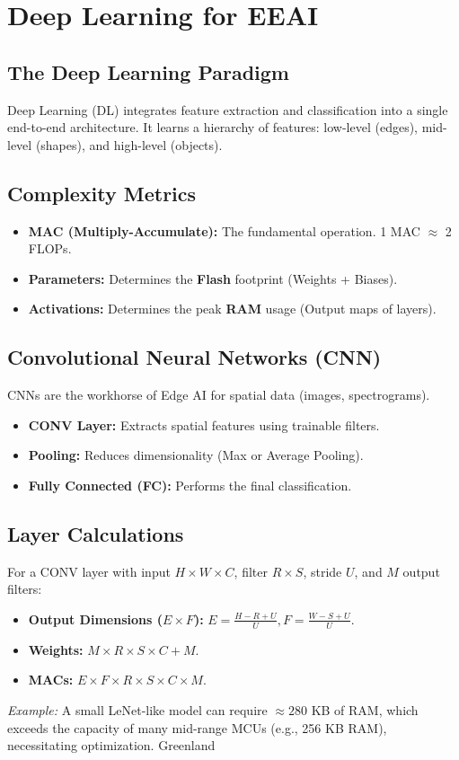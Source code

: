 \section{Deep Learning for EEAI}

\subsection{The Deep Learning Paradigm}
Deep Learning (DL) integrates feature extraction and classification into a single end-to-end architecture. It learns a hierarchy of features: low-level (edges), mid-level (shapes), and high-level (objects).

\subsection{Complexity Metrics}
\begin{itemize}
    \item \textbf{MAC (Multiply-Accumulate):} The fundamental operation. 1 MAC $\approx$ 2 FLOPs.
    \item \textbf{Parameters:} Determines the \textbf{Flash} footprint (Weights + Biases).
    \item \textbf{Activations:} Determines the peak \textbf{RAM} usage (Output maps of layers).
\end{itemize}

\subsection{Convolutional Neural Networks (CNN)}
CNNs are the workhorse of Edge AI for spatial data (images, spectrograms).
\begin{itemize}
    \item \textbf{CONV Layer:} Extracts spatial features using trainable filters.
    \item \textbf{Pooling:} Reduces dimensionality (Max or Average Pooling).
    \item \textbf{Fully Connected (FC):} Performs the final classification.
\end{itemize}

\subsection{Layer Calculations}
For a CONV layer with input $H \times W \times C$, filter $R \times S$, stride $U$, and $M$ output filters:
\begin{itemize}
    \item \textbf{Output Dimensions ($E \times F$):} $E = \frac{H-R+U}{U}, F = \frac{W-S+U}{U}$.
    \item \textbf{Weights:} $M \times R \times S \times C + M$.
    \item \textbf{MACs:} $E \times F \times R \times S \times C \times M$.
\end{itemize}
\textit{Example:} A small LeNet-like model can require $\approx 280$ KB of RAM, which exceeds the capacity of many mid-range MCUs (e.g., 256 KB RAM), necessitating optimization.
 Greenland
